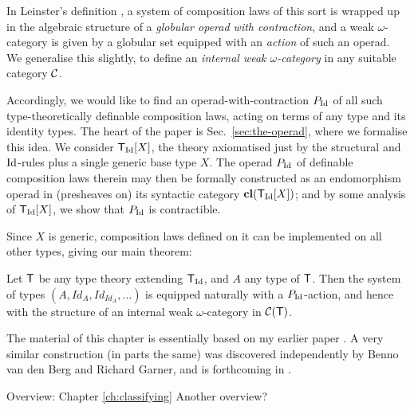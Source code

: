 \begin{para}In Leinster's definition \cite{leinster:book}, a system of composition laws of this sort is wrapped up in the algebraic structure of a \emph{globular operad with contraction}, and a weak $\omega$-category is given by a globular set equipped with an \emph{action} of such an operad.  We generalise this slightly, to define an \emph{internal weak $\omega$-category} in any suitable category $\mathcal{C}$.

Accordingly, we would like to find an operad-with-contraction $P_{\mathrm{Id}}$ of all such type-theoretically definable composition laws, acting on terms of any type and its identity types.  The heart of the paper is Sec.~\ref{sec:the-operad}, where we formalise this idea.  We consider $\mathsf{T}_{\mathrm{Id}}[X]$, the theory axiomatised just by the structural and $\mathrm{Id}$-rules plus a single generic base type $X$.  The operad $P_{\mathrm{Id}}$ of definable composition laws therein may then be formally constructed as an endomorphism operad in (presheaves on) its syntactic category $\mathbf{cl}(\mathsf{T}_{\mathrm{Id}} [X])$; and by some analysis of $\mathsf{T}_{\mathrm{Id}}[X]$, we show that $P_{\mathrm{Id}}$ is contractible.
\end{para}

Since $X$ is generic, composition laws defined on it can be implemented on all other types, giving our main theorem:

\begin{thm}Let $\mathsf{T}$ be any type theory extending $\mathsf{T}_{\mathrm{Id}}$, and $A$ any type of $\mathsf{T}$.  Then the system of types $(A, Id_A, Id_{Id_A}, \ldots)$ is equipped naturally with a $P_{\mathrm{Id}}$-action, and hence with the structure of an internal weak $\omega$-category in $\mathcal{C}(\mathsf{T})$.
\end{thm}

The material of this chapter is essentially based on my earlier paper \cite{lumsdaine:lmcs}.  A very similar construction (in parts the same)  was discovered independently by Benno van den Berg and Richard Garner, and is forthcoming in \cite{garner-van-den-berg}. \\



\begin{para}{Overview: Chapter \ref{ch:classifying}}
Another overview?
\end{para}
